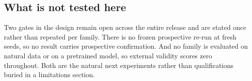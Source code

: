 \subsection{What is not tested here}

Two gates in the design remain open across the entire release and are stated
once rather than repeated per family. There is no frozen prospective re-run at
fresh seeds, so no result carries prospective confirmation. And no family is
evaluated on natural data or on a pretrained model, so external validity scores
zero throughout. Both are the natural next experiments rather than
qualifications buried in a limitations section.
